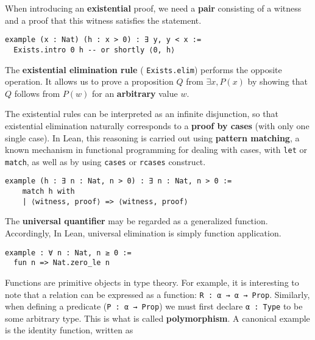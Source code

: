 \begin{example}
  When introducing an \textbf{existential} proof, 
  we need a \textbf{pair} consisting 
  of a witness and a proof that this witness 
  satisfies the statement.
  \begin{lstlisting}[language=lean]
example (x : Nat) (h : x > 0) : ∃ y, y < x :=
  Exists.intro 0 h -- or shortly ⟨0, h⟩
\end{lstlisting}
\end{example}
The \textbf{existential elimination rule} 
( \lstinline[language=lean]|Exists.elim|) performs the opposite operation. 
It allows us to prove a proposition $Q$ 
from $\exists x, P(x)$ by showing 
that $Q$  follows from $P(w)$  for an \textbf{arbitrary} 
value $w$.
\begin{example}
  The existential rules can be interpreted as an infinite 
  disjunction, 
  so that existential elimination naturally corresponds to a \textbf{proof by cases} (with only one single case). 
  In Lean, this reasoning is carried out using \textbf{pattern matching}, 
  a known mechanism in functional programming for dealing with cases,  
  with \lstinline[language=lean]|let| or \lstinline[language=lean]|match|, as well as by using \lstinline[language=lean]|cases| or 
  \lstinline[language=lean]|rcases| construct. 
  \begin{lstlisting}[language=lean]
  example (h : ∃ n : Nat, n > 0) : ∃ n : Nat, n > 0 :=
    match h with
    | ⟨witness, proof⟩ => ⟨witness, proof⟩
  \end{lstlisting}
\end{example}
\begin{example}
  The \textbf{universal quantifier} may be regarded as a generalized function.
Accordingly, In Lean, universal elimination is simply function application.
\begin{lstlisting}[language=lean]
example : ∀ n : Nat, n ≥ 0 :=
  fun n => Nat.zero_le n
\end{lstlisting}
\end{example}
Functions are primitive objects in type theory.
For example, it is interesting to note that a relation can be expressed as a function:
\lstinline[language=lean]|R : α → α → Prop|.
Similarly, when defining a predicate (\lstinline[language=lean]|P : α → Prop|) we must first declare 
\lstinline[language=lean]|α : Type| to be some arbitrary type. 
This is what is called \textbf{polymorphism}.
A canonical example is the identity function, written as 
